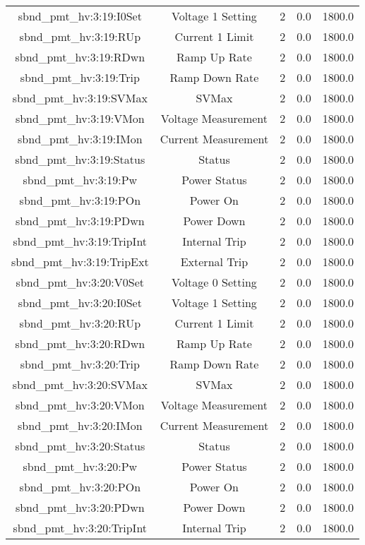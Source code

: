 \begin{table}[ptb]
\begin{tabular}{c | c c c c}
sbnd_pmt_hv:3:19:I0Set & Voltage 1 Setting & 2 & 0.0 & 1800.0\\ 
sbnd_pmt_hv:3:19:RUp & Current 1 Limit & 2 & 0.0 & 1800.0\\ 
sbnd_pmt_hv:3:19:RDwn & Ramp Up Rate & 2 & 0.0 & 1800.0\\ 
sbnd_pmt_hv:3:19:Trip & Ramp Down Rate & 2 & 0.0 & 1800.0\\ 
sbnd_pmt_hv:3:19:SVMax & SVMax & 2 & 0.0 & 1800.0\\ 
sbnd_pmt_hv:3:19:VMon & Voltage Measurement & 2 & 0.0 & 1800.0\\ 
sbnd_pmt_hv:3:19:IMon & Current Measurement & 2 & 0.0 & 1800.0\\ 
sbnd_pmt_hv:3:19:Status & Status & 2 & 0.0 & 1800.0\\ 
sbnd_pmt_hv:3:19:Pw & Power Status & 2 & 0.0 & 1800.0\\ 
sbnd_pmt_hv:3:19:POn & Power On & 2 & 0.0 & 1800.0\\ 
sbnd_pmt_hv:3:19:PDwn & Power Down & 2 & 0.0 & 1800.0\\ 
sbnd_pmt_hv:3:19:TripInt & Internal Trip & 2 & 0.0 & 1800.0\\ 
sbnd_pmt_hv:3:19:TripExt & External Trip & 2 & 0.0 & 1800.0\\ 
sbnd_pmt_hv:3:20:V0Set & Voltage 0 Setting & 2 & 0.0 & 1800.0\\ 
sbnd_pmt_hv:3:20:I0Set & Voltage 1 Setting & 2 & 0.0 & 1800.0\\ 
sbnd_pmt_hv:3:20:RUp & Current 1 Limit & 2 & 0.0 & 1800.0\\ 
sbnd_pmt_hv:3:20:RDwn & Ramp Up Rate & 2 & 0.0 & 1800.0\\ 
sbnd_pmt_hv:3:20:Trip & Ramp Down Rate & 2 & 0.0 & 1800.0\\ 
sbnd_pmt_hv:3:20:SVMax & SVMax & 2 & 0.0 & 1800.0\\ 
sbnd_pmt_hv:3:20:VMon & Voltage Measurement & 2 & 0.0 & 1800.0\\ 
sbnd_pmt_hv:3:20:IMon & Current Measurement & 2 & 0.0 & 1800.0\\ 
sbnd_pmt_hv:3:20:Status & Status & 2 & 0.0 & 1800.0\\ 
sbnd_pmt_hv:3:20:Pw & Power Status & 2 & 0.0 & 1800.0\\ 
sbnd_pmt_hv:3:20:POn & Power On & 2 & 0.0 & 1800.0\\ 
sbnd_pmt_hv:3:20:PDwn & Power Down & 2 & 0.0 & 1800.0\\ 
sbnd_pmt_hv:3:20:TripInt & Internal Trip & 2 & 0.0 & 1800.0\\ 

\end{tabular}
\end{table}
